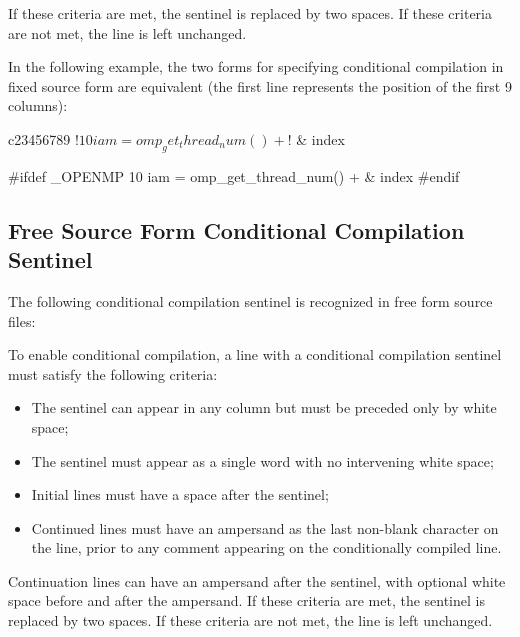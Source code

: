 \begin{fortranspecific}
If these criteria are met, the sentinel is replaced by two spaces. If these criteria 
are not met, the line is left unchanged.

\begin{note}
In the following example, the two forms for specifying conditional compilation
in fixed source form are equivalent (the first line represents the position of 
the first 9 columns):

\begin{ompfPragma}
c23456789
!$ 10 iam = omp_get_thread_num() +
!$   &          index

#ifdef _OPENMP
   10 iam = omp_get_thread_num() +
     &            index
#endif
\end{ompfPragma}
\end{note}



\subsection{Free Source Form Conditional Compilation Sentinel}
\label{subsec:Free Source Form Conditional Compilation Sentinel}
The following conditional compilation sentinel is recognized in free form source files:

\begin{ompfPragma}
!$
\end{ompfPragma} %

To enable conditional compilation, a line with a conditional compilation sentinel must
satisfy the following criteria:

\begin{itemize}
\item The sentinel can appear in any column but must be preceded only by white space;
\item The sentinel must appear as a single word with no intervening white space;
\item Initial lines must have a space after the sentinel;
\item Continued lines must have an ampersand as the last non-blank character on 
      the line, prior to any comment appearing on the conditionally compiled line. 
\end{itemize}

Continuation lines can have an ampersand after the sentinel, with optional white 
space before and after the ampersand. If these criteria are met, the sentinel is 
replaced by two spaces. If these criteria are not met, the line is left unchanged.


\end{fortranspecific}
